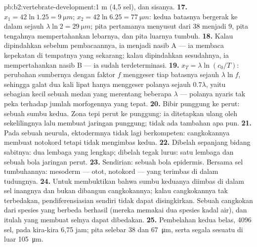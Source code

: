 \begin{solution}{pb:b2:vertebrate-development:1}
{m} (4,5 sel), dan sisanya.
\textbf{17.} $x_1 = 42\ln 1.25 = \qty{9}{\micro m}$; $x_2 = 42\ln 6.25
= \qty{77}{\micro m}$: kedua batasnya bergerak ke dalam sejauh
$\lambda\ln 2 =
\qty{29}{\micro m}$; pita pertamanya menyusut dari 38
menjadi 9, pita tengahnya mempertahankan lebarnya, dan pita luarnya
tumbuh.
\textbf{18.} Kalau dipindahkan sebelum pembacaannya, ia menjadi nasib A
--- ia membaca kepekatan di tempatnya yang sekarang; kalau dipindahkan
sesudahnya, ia mempertahankan nasib B --- ia sudah terdeterminasi.
\textbf{19.} $x_T = \lambda\ln(c_0/T)$: perubahan sumbernya dengan
faktor $f$ menggeser tiap batasnya sejauh $\lambda\ln f$, sehingga
galat dua kali lipat hanya menggeser polanya sejauh $0.7\lambda$, yaitu
sebagian kecil sebuah medan yang merentang beberapa $\lambda$ ---
polanya nyaris tak peka terhadap jumlah morfogennya yang tepat.
\textbf{20.} Bibir punggung ke perut: sebuah sumbu kedua. Zona tepi
perut ke punggung: ia ditetapkan ulang oleh sekelilingnya lalu membuat
jaringan punggung; tidak ada tambahan apa pun.
\textbf{21.} Pada sebuah neurula, ektodermnya tidak lagi berkompeten:
cangkokannya membuat notokord tetapi tidak mengimbas  kedua.
\textbf{22.} Dibelah sepanjang bidang sabitnya: dua lembaga yang
lengkap; dibelah tegak lurus: satu lembaga dan sebuah bola jaringan
perut.
\textbf{23.} Sendirian: sebuah bola epidermis. Bersama sel tumbuhannya:
mesoderm --- otot, notokord --- yang terimbas di dalam tudungnya.
\textbf{24.} Untuk membuktikan bahwa sumbu keduanya diimbas di dalam
sel inangnya dan bukan dibangun cangkokannya; kalau cangkokannya tak
terbedakan, pendiferensiasian sendiri tidak dapat disingkirkan. Sebuah
cangkokan dari spesies yang berbeda berhasil (mereka memakai dua
spesies kadal air), dan itulah yang membuat selnya dapat dibedakan.
\textbf{25.} Pembelahan kedua belas, 4096 sel, pada kira-kira 6,75 jam;
pita selebar 38 dan \qty{67}{\micro m}, serta segala sesuatu di luar
\qty{105}{\micro m}.
\end{solution}
